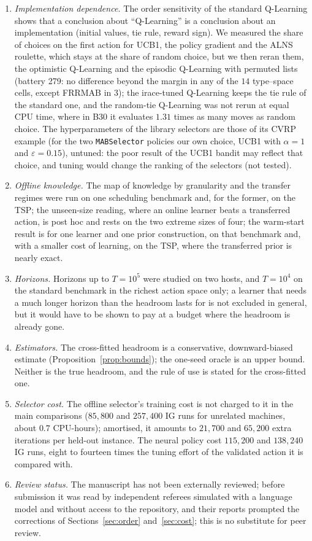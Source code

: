 \begin{enumerate}[label=(\roman*)]
\item \emph{Implementation dependence.} The order sensitivity of the standard Q-Learning shows that a conclusion about ``Q-Learning'' is a conclusion about an implementation (initial values, tie rule, reward sign). We measured the share of choices on the first action for UCB1, the policy gradient and the ALNS roulette, which stays at the share of random choice, but we then reran them, the optimistic Q-Learning and the episodic Q-Learning with permuted lists (battery 279: no difference beyond the margin in any of the $14$ type--space cells, except FRRMAB in $3$); the irace-tuned Q-Learning keeps the tie rule of the standard one, and the random-tie Q-Learning was not rerun at equal CPU time, where in B30 it evaluates $1.31$ times as many moves as random choice. The hyperparameters of the library selectors are those of its CVRP example (for the two \texttt{MABSelector} policies our own choice, UCB1 with $\alpha=1$ and $\varepsilon=0.15$), untuned: the poor result of the UCB1 bandit may reflect that choice, and tuning would change the ranking of the selectors (not tested).
\item \emph{Offline knowledge.} The map of knowledge by granularity and the transfer regimes were run on one scheduling benchmark and, for the former, on the TSP; the unseen-size reading, where an online learner beats a transferred action, is post hoc and rests on the two extreme sizes of four; the warm-start result is for one learner and one prior construction, on that benchmark and, with a smaller cost of learning, on the TSP, where the transferred prior is nearly exact.
\item \emph{Horizons.} Horizons up to $T=10^5$ were studied on two hosts, and $T=10^4$ on the standard benchmark in the richest action space only; a learner that needs a much longer horizon than the headroom lasts for is not excluded in general, but it would have to be shown to pay at a budget where the headroom is already gone.
\item \emph{Estimators.} The cross-fitted headroom is a conservative, downward-biased estimate (Proposition~\ref{prop:bounds}); the one-seed oracle is an upper bound. Neither is the true headroom, and the rule of use is stated for the cross-fitted one.
\item \emph{Selector cost.} The offline selector's training cost is not charged to it in the main comparisons ($85{,}800$ and $257{,}400$ IG runs for unrelated machines, about $0.7$ CPU-hours); amortised, it amounts to $21{,}700$ and $65{,}200$ extra iterations per held-out instance. The neural policy cost $115{,}200$ and $138{,}240$ IG runs, eight to fourteen times the tuning effort of the validated action it is compared with.
\item \emph{Review status.} The manuscript has not been externally reviewed; before submission it was read by independent referees simulated with a language model and without access to the repository, and their reports prompted the corrections of Sections~\ref{sec:order} and~\ref{sec:cost}; this is no substitute for peer review.
\end{enumerate}

